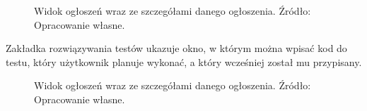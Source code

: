 \documentclass[twoside]{projektInzynierskiMS}
\numberwithin{figure}{section}
\begin{document}
\begin{figure}[h!]
{\hfill
}
\caption{Widok ogłoszeń wraz ze szczegółami danego ogłoszenia. Źródło: Opracowanie własne.}
\label{fig:mobile_announcements_with_details}
\end{figure}
\newpage
Zakładka rozwiązywania testów ukazuje okno, w którym można wpisać kod do testu, który użytkownik planuje wykonać, a który wcześniej został mu przypisany. 

\begin{figure}[h!]
\caption{Widok ogłoszeń wraz ze szczegółami danego ogłoszenia. Źródło: Opracowanie własne.}
\label{fig:mobile_test_code_view}
\end{figure}
\end{document}
